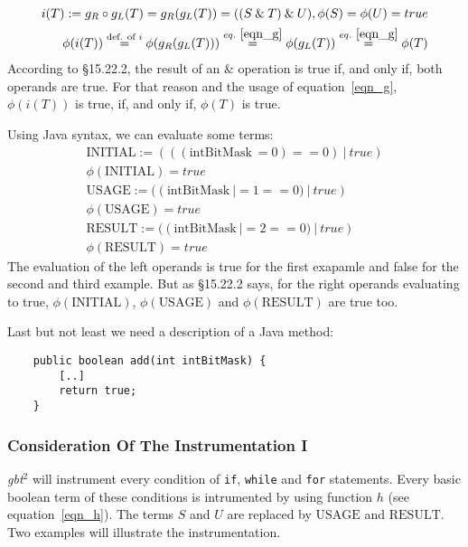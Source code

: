\documentclass[a4paper,12pt,DIV12]{scrartcl}
\newcommand{\gbt}{\textit{gbt$^2$}\xspace}
\begin{document}
\begin{equation}\label{eqn_i}\begin{split}
i(T) := g_{R} \circ g_{L}(T) = g_{R}(g_{L}(T)) = ((S \: \& \: T) \: \& \: U), \phi(S) = \phi(U) = true\\
\phi(i(T)) \stackrel{\text{def. of $i$}}{=} \phi(g_{R}(g_{L}(T))) \stackrel{eq.~\eqref{eqn_g}}{=} \phi(g_{L}(T)) \stackrel{eq.~\eqref{eqn_g}}{=} \phi(T)
\end{split}\end{equation}
According to §15.22.2, the result of an \& operation is true if, and only if, both operands are true. For that reason and the usage of equation~\eqref{eqn_g}, $\phi(i(T))$ is true, if, and only if, $\phi(T)$ is true.

Using Java syntax, we can evaluate some terms:
\begin{equation}\label{eqn_5}\begin{split}
\text{INITIAL} := (((\text{intBitMask} \: = 0) == 0) \: | \: true)\\
\phi(\text{INITIAL}) = true\\
\text{USAGE} := ((\text{intBitMask} \: |= 1 == 0) \: | \: true)\\
\phi(\text{USAGE}) = true\\
\text{RESULT} := ((\text{intBitMask} \: |= 2 == 0) \: | \: true)\\
\phi(\text{RESULT}) = true
\end{split}\end{equation}
The evaluation of the left operands is true for the first exapamle and false for the second and third example. But as §15.22.2 says, for the right operands evaluating to true, $\phi(\text{INITIAL})$, $\phi(\text{USAGE})$ and $\phi(\text{RESULT})$ are true too.

Last but not least we need a description of a Java method:
\begin{verbatim}
    public boolean add(int intBitMask) {
        [..]
        return true;
    }
\end{verbatim}

\subsubsection{Consideration Of The Instrumentation I}
\gbt will instrument every condition of \texttt{if}, \texttt{while} and \texttt{for} statements. Every basic boolean term of these conditions is intrumented by using function $h$ (see equation~\eqref{eqn_h}). The terms $S$ and $U$ are replaced by $\text{USAGE}$ and $\text{RESULT}$. Two examples will illustrate the instrumentation.
\end{document}
